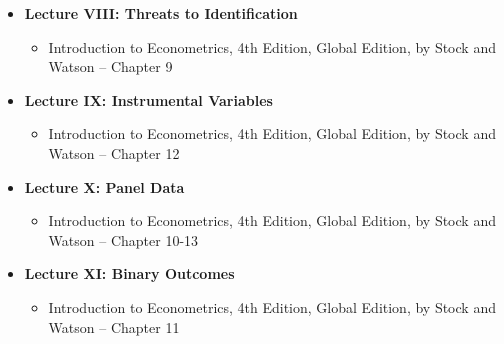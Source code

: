 \documentclass[12pt]{article}
\begin{document}
\begin{itemize}
    \item \textbf{Lecture VIII: Threats to Identification}
    \begin{itemize}
        \item Introduction to Econometrics, 4th Edition, Global Edition, by Stock and Watson -- Chapter 9

    \end{itemize}

    \item \textbf{Lecture IX: Instrumental Variables}
    \begin{itemize}
        \item Introduction to Econometrics, 4th Edition, Global Edition, by Stock and Watson -- Chapter 12

    \end{itemize}

    \item \textbf{Lecture X: Panel Data}
    \begin{itemize}
        \item Introduction to Econometrics, 4th Edition, Global Edition, by Stock and Watson -- Chapter 10-13
    \end{itemize}

    \item \textbf{Lecture XI: Binary Outcomes}
    \begin{itemize}
        \item Introduction to Econometrics, 4th Edition, Global Edition, by Stock and Watson -- Chapter 11

    \end{itemize}

\end{itemize}
\end{document}
